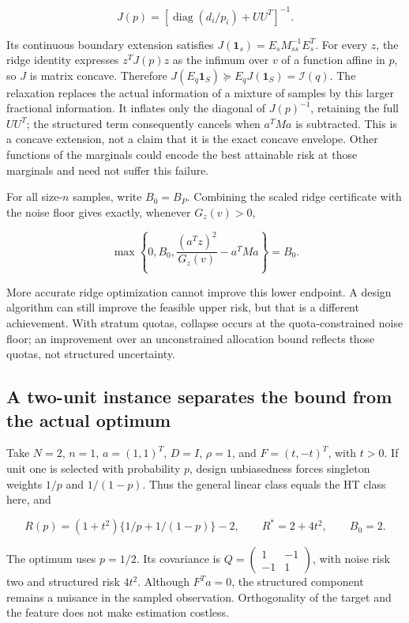 \documentclass[11pt]{article}
\begin{document}
\[
J(p)=\left[\operatorname{diag}(d_i/p_i)+UU^T\right]^{-1}.
\]

Its continuous boundary extension satisfies
\(J(\mathbf1_s)=E_sM_{ss}^{-1}E_s^T\). For every \(z\), the ridge
identity expresses \(z^TJ(p)z\) as the infimum over \(v\) of a function
affine in \(p\), so \(J\) is matrix concave. Therefore
\(J(E_q\mathbf1_S)\succeq E_qJ(\mathbf1_S)=\mathcal I(q)\). The
relaxation replaces the actual information of a mixture of samples by
this larger fractional information. It inflates only the diagonal of
\(J(p)^{-1}\), retaining the full \(UU^T\); the structured term
consequently cancels when \(a^TMa\) is subtracted. This is a concave
extension, not a claim that it is the exact concave envelope. Other
functions of the marginals could encode the best attainable risk at
those marginals and need not suffer this failure.

For all size-\(n\) samples, write \(B_0=B_P\). Combining the scaled
ridge certificate with the noise floor gives exactly, whenever
\(G_z(v)>0\),

\begin{equation}\label{eq:15}
\max\left\{0,B_0,\frac{(a^Tz)^2}{G_z(v)}-a^TMa\right\}=B_0. 
\end{equation}

More accurate ridge optimization cannot improve this lower endpoint. A
design algorithm can still improve the feasible upper risk, but that is
a different achievement. With stratum quotas, collapse occurs at the
quota-constrained noise floor; an improvement over an unconstrained
allocation bound reflects those quotas, not structured uncertainty.

\subsection{A two-unit instance separates the bound from the actual
optimum}\label{a-two-unit-instance-separates-the-bound-from-the-actual-optimum}

Take \(N=2\), \(n=1\), \(a=(1,1)^T\), \(D=I\), \(\rho=1\), and
\(F=(t,-t)^T\), with \(t>0\). If unit one is selected with probability
\(p\), design unbiasedness forces singleton weights \(1/p\) and
\(1/(1-p)\). Thus the general linear class equals the HT class here, and

\begin{equation}\label{eq:16}
R(p)=(1+t^2)\{1/p+1/(1-p)\}-2,
\qquad R^*=2+4t^2,
\qquad B_0=2. 
\end{equation}

The optimum uses \(p=1/2\). Its covariance is
\(Q=\left(\begin{smallmatrix}1&-1\\-1&1\end{smallmatrix}\right)\), with
noise risk two and structured risk \(4t^2\). Although \(F^Ta=0\), the
structured component remains a nuisance in the sampled observation.
Orthogonality of the target and the feature does not make estimation
costless.
\end{document}
